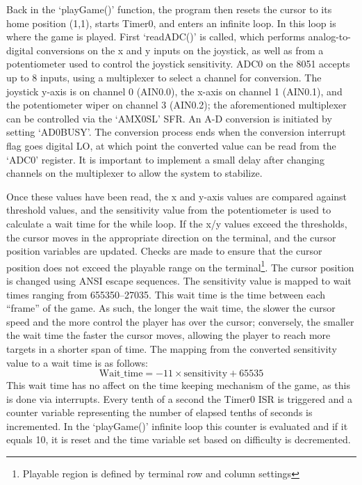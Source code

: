 \documentclass[12pt]{article}
\begin{document}
	Back in the `playGame()' function, the program then resets the cursor to its home position (1,1), starts Timer0, and enters an infinite loop. In this loop is where the game is played. First `readADC()' is called, which performs analog-to-digital conversions on the x and y inputs on the joystick, as well as from a potentiometer used to control the joystick sensitivity. ADC0 on the 8051 accepts up to 8 inputs, using a multiplexer to select a channel for conversion. The joystick y-axis is on channel 0 (AIN0.0), the x-axis on channel 1 (AIN0.1), and the potentiometer wiper on channel 3 (AIN0.2); the aforementioned multiplexer can be controlled via the `AMX0SL' SFR. An A-D conversion is initiated by setting `AD0BUSY'. The conversion process ends when the conversion interrupt flag goes digital LO, at which point the converted value can be read from the `ADC0' register. It is important to implement a small delay after changing channels on the multiplexer to allow the system to stabilize. 
	
	Once these values have been read, the x and y-axis values are compared against threshold values, and the sensitivity value from the potentiometer is used to calculate a wait time for the while loop. If the x/y values exceed the thresholds, the cursor moves in the appropriate direction on the terminal, and the cursor position variables are updated. Checks are made to ensure that the cursor position does not exceed the playable range on the terminal\footnote{Playable region is defined by terminal row and column settings}. The cursor position is changed using ANSI escape sequences. The sensitivity value is mapped to wait times ranging from 655350--27035. This wait time is the time between each ``frame'' of the game. As such, the longer the wait time, the slower the cursor speed and the more control the player has over the cursor; conversely, the smaller the wait time the faster the cursor moves, allowing the player to reach more targets in a shorter span of time. The mapping from the converted sensitivity value to a wait time is as follows: 
	\begin{displaymath}
		\mathrm{Wait\_time}=-11\times \mathrm{sensitivity}+65535
	\end{displaymath}
	This wait time has no affect on the time keeping mechanism of the game, as this is done via interrupts. Every tenth of a second the Timer0 ISR is triggered and a counter variable representing the number of elapsed tenths of seconds is incremented. In the `playGame()' infinite loop this counter is evaluated and if it equals 10, it is reset and the time variable set based on difficulty is decremented. 
	
\end{document}
